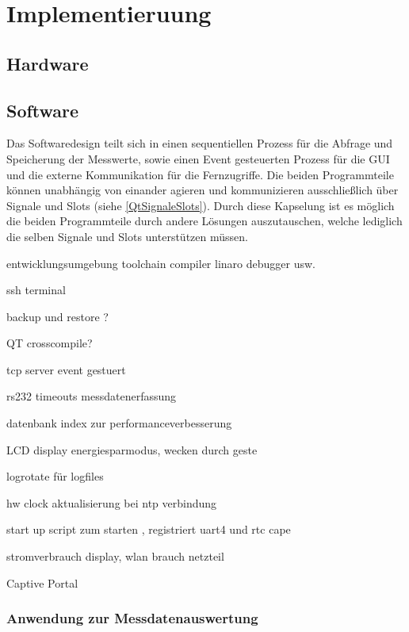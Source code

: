\chapter{Implementieruung}
\label{chapter_Implementierung}

\section{Hardware}

\section{Software}


Das Softwaredesign teilt sich in einen sequentiellen Prozess für die Abfrage und Speicherung der Messwerte, sowie einen Event gesteuerten Prozess für die \ac{GUI} und die externe Kommunikation für die Fernzugriffe. 
Die beiden Programmteile können unabhängig von einander agieren und kommunizieren ausschließlich über Signale und Slots (siehe \ref{QtSignaleSlots}). Durch diese Kapselung ist es möglich die beiden Programmteile durch andere Lösungen auszutauschen, welche lediglich die selben Signale und Slots unterstützen müssen.\ 



entwicklungsumgebung toolchain compiler linaro debugger usw. 

ssh terminal

backup und restore ?

QT crosscompile?

tcp server event gestuert

rs232 timeouts messdatenerfassung

datenbank index zur performanceverbesserung

LCD display energiesparmodus, wecken durch geste

logrotate für logfiles

hw clock aktualisierung bei ntp verbindung

start up script zum starten , registriert uart4 und rtc cape

stromverbrauch display, wlan brauch netzteil

Captive Portal
\subsection{Anwendung zur Messdatenauswertung}